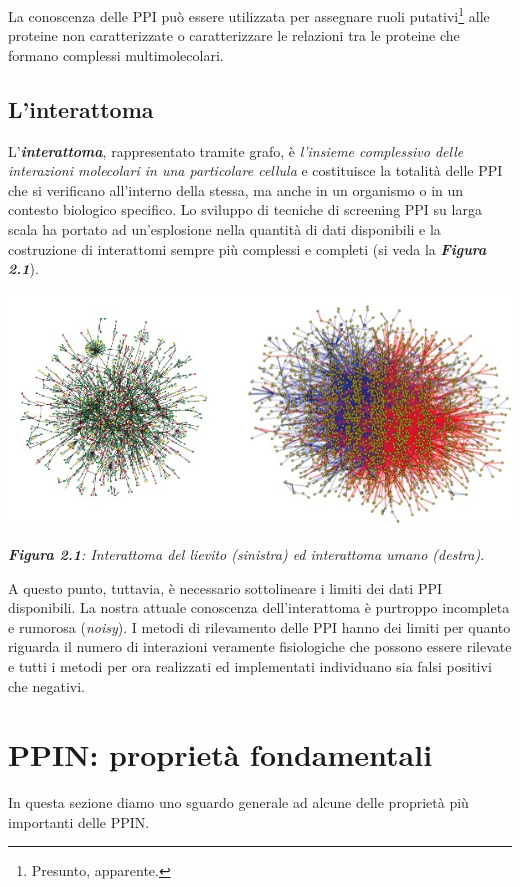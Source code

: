 \documentclass[11pt]{article}
\begin{document}
La conoscenza delle PPI può essere utilizzata per assegnare ruoli putativi\footnote{Presunto, apparente.} alle proteine non caratterizzate o caratterizzare le relazioni tra le proteine che formano complessi multimolecolari.

\subsection{L'interattoma}
L'\textbf{\textit{interattoma}}, rappresentato tramite grafo, è \textit{l'insieme complessivo delle interazioni molecolari in una particolare cellula} e costituisce la totalità delle PPI che si verificano all'interno della stessa, ma anche in un organismo o in un contesto biologico specifico. Lo sviluppo di tecniche di screening PPI su larga scala ha portato ad un'esplosione nella quantità di dati disponibili e la costruzione di interattomi sempre più complessi e completi (si veda la \textit{\textbf{Figura 2.1}}).

\begin{center}
\includegraphics[scale=0.6]{interact}

\begin{small}\textit{\textbf{Figura 2.1}: Interattoma del lievito (sinistra) ed interattoma umano (destra)}.\end{small}
\end{center}

A questo punto, tuttavia, è necessario sottolineare i limiti dei dati PPI disponibili. La nostra attuale conoscenza dell'interattoma è purtroppo incompleta e rumorosa (\textit{noisy}). I metodi di rilevamento delle PPI hanno dei limiti per quanto riguarda il numero di interazioni veramente fisiologiche che possono essere rilevate e tutti i metodi per ora realizzati ed implementati individuano sia falsi positivi che negativi.

\section{PPIN: proprietà fondamentali}
In questa sezione diamo uno sguardo generale ad alcune delle proprietà più importanti delle PPIN.
\end{document}

